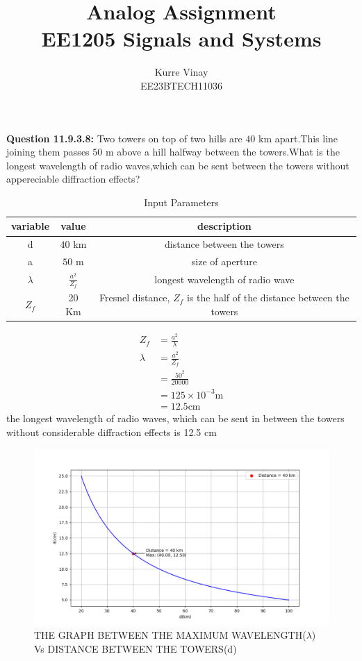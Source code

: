 \documentclass[a4,12pt,onecolumn]{IEEEtran}
\begin{document}
\title{
\Huge\textbf{ Analog Assignment}\\
\Huge\textbf{EE1205} Signals and Systems\\
}
\large\author{Kurre Vinay\\EE23BTECH11036}
\maketitle
\textbf{Question 11.9.3.8:}
 Two towers on top of two hills are $40$ km apart.This line joining them passes $50$ m above a hill halfway between the towers.What is the longest wavelength of radio waves,which can be sent between the towers without  appereciable diffraction effects?\\
\solution
\begin{table}[ht!]
 \begin{center}
\begin{tabular}{|c|c|c|}
   \hline
   variable&value&description  \\
   \hline
   d & $40$ km& distance between the towers\\
   \hline
   a & $50$ m & size of aperture \\
   \hline
   $\lambda$ &$\frac{a^2}{Z_f} $ & longest wavelength of radio wave\\
   \hline
   $Z_f$ &20 Km &Fresnel distance, $Z_f$ is the half of the distance between the towers \\
   \hline
\end{tabular}
\caption{\large{Input Parameters}}
\end{center}
\end{table}
\begin{align}
Z_f&=\frac{a^2}{\lambda}\\
\lambda &= \frac{a^2}{Z_f}\\
&=\frac{50^2}{20000}\\
&= 125 \times 10^{-3} \text{m}\\
&= 12.5 \text{cm}\end{align}
the longest wavelength of radio waves, which can be sent in between the towers without considerable diffraction effects is 12.5 cm 
\begin{figure}[ht!]
\includegraphics[width=\columnwidth]{fig/fig2.png}
\caption{THE GRAPH BETWEEN THE MAXIMUM WAVELENGTH($\lambda$) Vs DISTANCE BETWEEN THE TOWERS(d)}
\end{figure}
\end{document}
